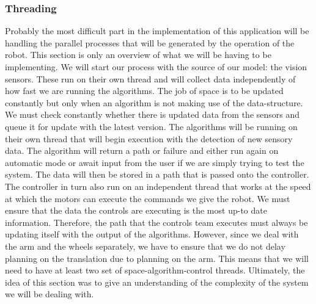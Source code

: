 \documentclass[titlepage]{article}
\begin{document}
\subsubsection{Threading}
Probably the most difficult part in the implementation of this application will be handling the parallel processes that will be generated by the operation of the robot. This section is only an overview of what we will be having to be implementing. We will start our process with the source of our model: the vision sensors. These run on their own thread and will collect data independently of how fast we are running the algorithms. The job of space is to be updated constantly but only when an algorithm is not making use of the data-structure. We must check constantly whether there is updated data from the sensors and queue it for update with the latest version.
The algorithms will be running on their own thread that will begin execution with the detection of new sensory data. The algorithm will return a path or failure and either run again on automatic mode or await input from the user if we are simply trying to test the system. The data will then be stored in a path that is passed onto the controller.
The controller in turn also run on an independent thread that works at the speed at which the motors can execute the commands we give the robot. We must ensure that the data the controls are executing is the most up-to date information. Therefore, the path that the controls team executes must always be updating itself with the output of the algorithms. However, since we deal with the arm and the wheels separately, we have to ensure that we do not delay planning on the translation due to planning on the arm. This means that we will need to have at least two set of  space-algorithm-control threads. Ultimately, the idea of this section was to give an understanding of the complexity of the system we will be dealing with. 
\end{document}

